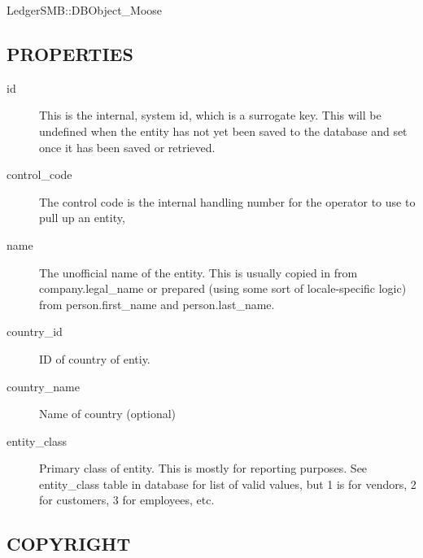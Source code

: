 \begin{description}
\begin{description}
\begin{description}
\begin{description}
\begin{description}
\begin{description}
\begin{description}
\begin{description}
\begin{description}
\begin{description}
\begin{description}
\item[{LedgerSMB::DBObject\_Moose}] \mbox{}\end{description}
\subsection*{PROPERTIES\label{LedgerSMB::DBObject::Entity_-_-_Entity_Management_base_classes_for_LedgerSMB_PROPERTIES}}
\begin{description}

\item[{id}] \mbox{}

This is the internal, system id, which is a surrogate key.  This will be undefined when
the entity has not yet been saved to the database and set once it has been saved or 
retrieved.


\item[{control\_code}] \mbox{}

The control code is the internal handling number for the operator to use to pull up 
an entity,


\item[{name}] \mbox{}

The unofficial name of the entity.  This is usually copied in from company.legal\_name
or prepared (using some sort of locale-specific logic) from person.first\_name and
person.last\_name.


\item[{country\_id}] \mbox{}

ID of country of entiy.


\item[{country\_name}] \mbox{}

Name of country (optional)


\item[{entity\_class}] \mbox{}

Primary class of entity.  This is mostly for reporting purposes.  See entity\_class
table in database for list of valid values, but 1 is for vendors, 2 for customers, 
3 for employees, etc.

\end{description}
\subsection*{COPYRIGHT\label{LedgerSMB::DBObject::Entity_-_-_Entity_Management_base_classes_for_LedgerSMB_COPYRIGHT}}



\end{description}
\end{description}
\end{description}
\end{description}
\end{description}
\end{description}
\end{description}
\end{description}
\end{description}
\end{description}
